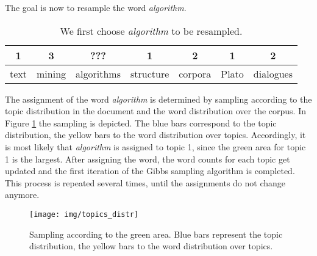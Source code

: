 \documentclass[a4paper,ngerman, english]{atseminar}
\begin{document}
\begin{example}
The goal is now to resample the word \textit{algorithm}.

\begin{table}[h]
\centering
\caption{We first choose \textit{algorithm} to be resampled.}
\begin{tabular}{ | c | c | c | c | c | c | c |}
\hline
1 & 3 & ??? & 1 & 2 & 1 & 2 \\
\hline
text & mining & algorithms & structure & corpora & Plato & dialogues \\
\hline
\end{tabular}
\end{table}

The assignment of the word \textit{algorithm} is determined by sampling according
to the topic distribution in the document and the word distribution over the corpus.
In Figure \ref{fig:topics_distr} the sampling is depicted. The blue bars correspond to 
the topic distribution, the yellow bars to the word distribution over topics.
Accordingly, it is most likely that \textit{algorithm} is assigned to topic 1, since the green 
area for topic 1 is the largest.
After assigning the word, the word counts for each topic get updated and 
the first iteration of the Gibbs sampling algorithm is completed. This process is 
repeated several times, until the assignments do not change anymore. 


\begin{figure}[H]
\centering
\texttt{[image: img/topics\_distr]}
 \caption{Sampling according to the green area. Blue bars represent the topic distribution, the yellow bars to the word distribution over topics.}
  \label{fig:topics_distr}
\end{figure}


\end{example}
\end{document}
